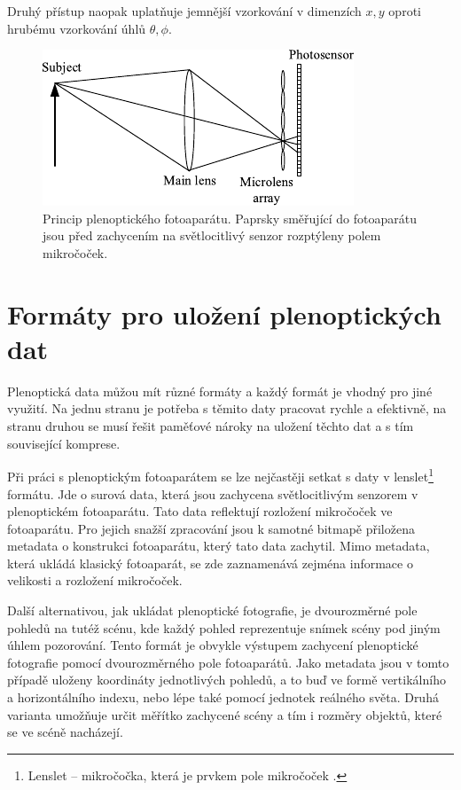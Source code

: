 Druhý přístup naopak uplatňuje jemnější vzorkování v dimenzích $x, y$ oproti hrubému vzorkování úhlů $\theta, \phi$.

\begin{figure}[h]
	\centering
		\includegraphics[width=.4\textwidth]{obrazky-figures/pleno-cam.pdf}
		\caption{Princip plenoptického fotoaparátu. Paprsky směřující do fotoaparátu jsou před zachycením na světlocitlivý senzor rozptýleny polem mikročoček.}
		\label{plenoPrincip}
\end{figure}

\section{Formáty pro uložení plenoptických dat}
\label{light-field-formats}
Plenoptická data můžou mít různé formáty a každý formát je vhodný pro jiné využití.
Na jednu stranu je potřeba s těmito daty pracovat rychle a efektivně, na stranu druhou se musí řešit paměťové nároky na uložení těchto dat a s tím související komprese.

Při práci s plenoptickým fotoaparátem se lze nejčastěji setkat s daty v lenslet\footnote{Lenslet -- mikročočka, která je prvkem pole mikročoček \cite{lenslet}.} formátu. Jde o surová data, která jsou zachycena světlocitlivým senzorem v plenoptickém fotoaparátu.
Tato data reflektují rozložení mikročoček ve fotoaparátu.
Pro jejich snažší zpracování jsou k samotné bitmapě přiložena metadata o konstrukci fotoaparátu, který tato data zachytil.
Mimo metadata, která ukládá klasický fotoaparát, se zde zaznamenává zejména informace o velikosti a rozložení mikročoček.

Další alternativou, jak ukládat plenoptické fotografie, je dvourozměrné pole pohledů na tutéž scénu, kde každý pohled reprezentuje snímek scény pod jiným úhlem pozorování.
Tento formát je obvykle výstupem zachycení plenoptické fotografie pomocí dvourozměrného pole fotoaparátů.
Jako metadata jsou v tomto případě uloženy koordináty jednotlivých pohledů, a to buď ve formě vertikálního a horizontálního indexu, nebo lépe také pomocí jednotek reálného světa.
Druhá varianta umožňuje určit měřítko zachycené scény a tím i rozměry objektů, které se ve scéně nacházejí.

